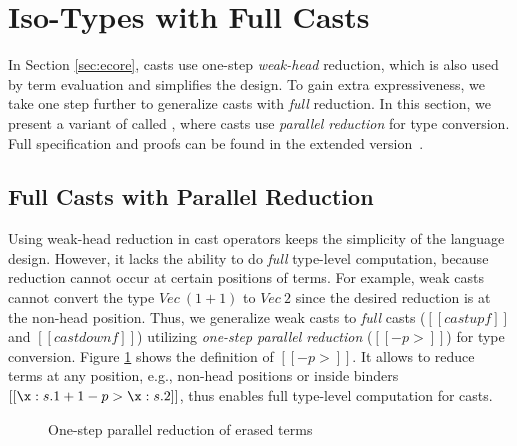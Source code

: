 \section{Iso-Types with Full Casts}\label{sec:full}

In Section \ref{sec:ecore}, casts use one-step \emph{weak-head} reduction,
which is also used by term evaluation and simplifies the design. To gain
extra expressiveness, we take one step further to generalize casts
with \emph{full} reduction. In this section, we present a variant of
\name called \namef, where casts use \emph{parallel reduction} for
type conversion. Full specification and proofs can be found in the extended version~\cite{full}.


\subsection{Full Casts with Parallel Reduction}

Using weak-head reduction in cast operators keeps the simplicity of the
language design. However, it lacks the ability to do \emph{full}
type-level computation, because reduction cannot occur at certain
positions of terms. For example, weak casts cannot convert the type
$\mathit{Vec}~(1 + 1)$ to $\mathit{Vec}~2$ since the desired reduction
is at the non-head position. Thus, we generalize weak casts to
\emph{full} casts ($[[castupf]]$ and $[[castdownf]]$) utilizing
\emph{one-step parallel reduction} ($[[-p>]]$) for type conversion.
Figure \ref{fig:full:pared} shows the definition of $[[-p>]]$. It allows to reduce terms
at any position, e.g., non-head positions or inside binders
$[[\x:s.1+1 -p> \x:s.2]]$, thus enables full type-level computation
for casts.

\begin{figure}[t]
\begin{small}
\centering
\renewcommand{\ottdrule}[4][]{{\inferrule{#2 }{#3}\,{\scriptsize \ottdrulename{#4}}}}
\renewenvironment{ottdefnblock}[3][]{\raggedright \framebox{\mbox{#2}} \quad #3 \\[0pt]}{}
\renewcommand{\ottusedrule}[1]{$#1\quad$}
\begin{spacing}{0.9}
\ottdefnstepp{}
\end{spacing}
\end{small}
\caption{One-step parallel reduction of erased terms}
    \label{fig:full:pared}
\end{figure}

